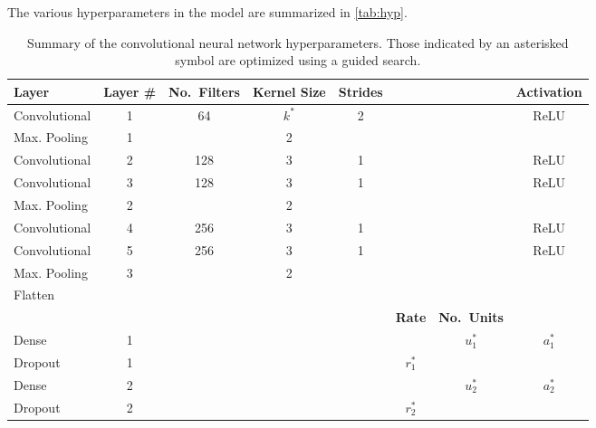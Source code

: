 \documentclass[Journal,letterpaper, SingleSpace, InsideFigs]{ascelike-new}
\begin{document}
The various hyperparameters in the model are summarized in \autoref{tab:hyp}.
\begin{table}[]\small
{}
    \centering
    \begin{tabular}{l c c c c c c c}\toprule
    \bf Layer & \bf Layer \# & \bf No.\ Filters & \bf Kernel Size & \bf Strides &
     &  & \bf Activation \\\midrule
    Convolutional  & 1         & 64                & $k^*$   & 2           &&& ReLU \\
    Max. Pooling   & 1         &                   & 2               &&&             &      \\
    Convolutional  & 2         & 128               & 3   & 1           &&& ReLU \\
    Convolutional  & 3         & 128               & 3   & 1           &&& ReLU \\
    Max. Pooling   & 2         &                   & 2               &&&             &      \\    
    Convolutional  & 4         & 256               & 3   & 1           &&& ReLU \\
    Convolutional  & 5         & 256               & 3   & 1           &&& ReLU \\
    Max. Pooling   & 3         &                   & 2               &             &&&      \\\midrule
    Flatten & & & & &&& \\\midrule
     &  &   &  & &
     \bf Rate & \bf No.\ Units & \\\midrule
    Dense           & 1  & & &  & & $u_1^*$ & $a_1^*$ \\
    Dropout         & 1  & & &  & $r_1^*$ & &  \\
    Dense           & 2  & & &  & & $u_2^*$ & $a_2^*$ \\
    Dropout         & 2  & & &  & $r_2^*$ & & \\ \bottomrule
    \end{tabular}
    \caption{Summary of the convolutional neural network hyperparameters. 
    Those indicated by an asterisked symbol are optimized using a guided search.}
    \label{tab:hyp}
\end{table}
\end{document}
